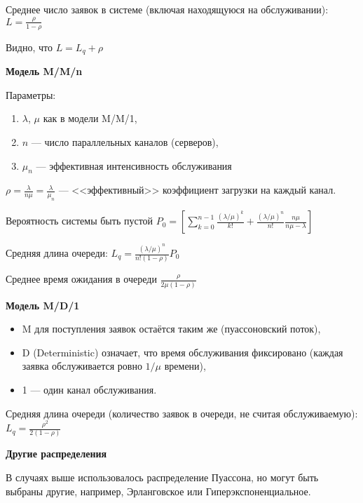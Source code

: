 Среднее число заявок в системе (включая находящуюся на обслуживании): $L = \frac{\rho}{1 - \rho}$

Видно, что $L = L_q + \rho$

\textbf{Модель M/M/n}

Параметры:
\begin{enumerate}
    \item $\lambda$, $\mu$ как в модели M/M/1,
    \item $n$ --- число параллельных каналов (серверов),
    \item $\mu_n$ --- эффективная интенсивность обслуживания
\end{enumerate}

$\rho = \frac{\lambda}{n \mu} = \frac{\lambda}{\mu_n}$ --- <<эффективный>> коэффициент загрузки на каждый канал.

Вероятность системы быть пустой $P_0 = \left[ \sum \limits ^{n-1} _{k=0} \frac{(\lambda / \mu) ^ k}{k!} + \frac{(\lambda / \mu) ^ n}{n!} \frac{n\mu}{n\mu - \lambda} \right]$

Средняя длина очереди: $L_q = \frac{(\lambda / \mu) ^ n}{n! (1-\rho)} P_0$

Среднее время ожидания в очереди $\frac{\rho}{2 \mu (1 - \rho)}$

\textbf{Модель M/D/1}
\begin{itemize}
    \item M для поступления заявок остаётся таким же (пуассоновский поток),
    \item D (Deterministic) означает, что время обслуживания фиксировано (каждая заявка обслуживается ровно $1 / \mu$ времени),
    \item 1 --- один канал обслуживания.
\end{itemize}

Средняя длина очереди (количество заявок в очереди, не считая обслуживаемую): $L_q = \frac{\rho ^ 2}{2 (1 - \rho)}$

\textbf{Другие распределения}

В случаях выше использовалось распределение Пуассона, но могут быть выбраны другие, например, Эрланговское или Гиперэкспоненциальное.

